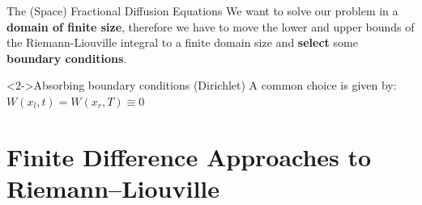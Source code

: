 \documentclass[aspectratio=169,xcolor=dvipsnames]{beamer}
\begin{document}
\begin{frame}{The (Space) Fractional Diffusion Equations}
We want to solve our problem in a \textbf{domain of finite size}, therefore we have to move the lower and upper bounds of the Riemann-Liouville integral to a finite domain size and \textbf{select} some \textbf{\alert{boundary conditions}}.

\begin{block}<2->{Absorbing boundary conditions (Dirichlet)}
A common choice is given by: $W(x_l,t) = W(x_r,T) \equiv 0$
\end{block}


\end{frame}

\section{Finite Difference Approaches to Riemann--Liouville}
\end{document}

